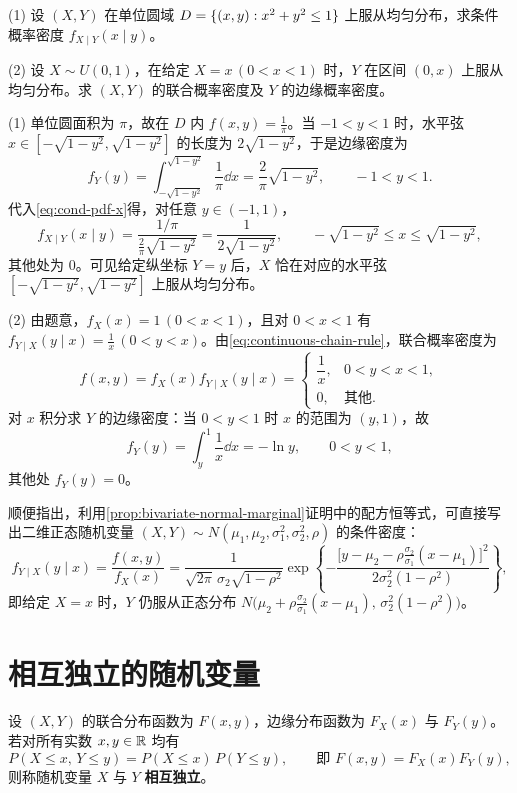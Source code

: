 \begin{example}[title={圆域均匀分布的条件密度与分层连续模型}]
\label{eg:disk-and-hierarchical-cond}
(1) 设 $(X,Y)$ 在单位圆域 $D=\{(x,y):x^2+y^2\le 1\}$ 上服从均匀分布，求条件概率密度 $f_{X\mid Y}(x\mid y)$。

(2) 设 $X\sim U(0,1)$，在给定 $X=x\,(0<x<1)$ 时，$Y$ 在区间 $(0,x)$ 上服从均匀分布。求 $(X,Y)$ 的联合概率密度及 $Y$ 的边缘概率密度。
\begin{solution}
(1) 单位圆面积为 $\pi$，故在 $D$ 内 $f(x,y)=\frac{1}{\pi}$。当 $-1<y<1$ 时，水平弦 $x\in[-\sqrt{1-y^2},\sqrt{1-y^2}]$ 的长度为 $2\sqrt{1-y^2}$，于是边缘密度为
\[
  f_Y(y)=\int_{-\sqrt{1-y^2}}^{\sqrt{1-y^2}}\frac{1}{\pi}\dd x=\frac{2}{\pi}\sqrt{1-y^2},\qquad -1<y<1.
\]
代入\eqref{eq:cond-pdf-x}得，对任意 $y\in(-1,1)$，
\[
  f_{X\mid Y}(x\mid y)=\frac{1/\pi}{\frac{2}{\pi}\sqrt{1-y^2}}=\frac{1}{2\sqrt{1-y^2}},\qquad -\sqrt{1-y^2}\le x\le\sqrt{1-y^2},
\]
其他处为 $0$。可见给定纵坐标 $Y=y$ 后，$X$ 恰在对应的水平弦 $[-\sqrt{1-y^2},\sqrt{1-y^2}]$ 上服从均匀分布。

(2) 由题意，$f_X(x)=1\,(0<x<1)$，且对 $0<x<1$ 有 $f_{Y\mid X}(y\mid x)=\frac{1}{x}\,(0<y<x)$。由\eqref{eq:continuous-chain-rule}，联合概率密度为
\[
  f(x,y)=f_X(x)f_{Y\mid X}(y\mid x)=
  \begin{cases}
    \dfrac{1}{x},& 0<y<x<1,\\
    0,& \text{其他}.
  \end{cases}
\]
对 $x$ 积分求 $Y$ 的边缘密度：当 $0<y<1$ 时 $x$ 的范围为 $(y,1)$，故
\[
  f_Y(y)=\int_{y}^{1}\frac{1}{x}\dd x=-\ln y,\qquad 0<y<1,
\]
其他处 $f_Y(y)=0$。
\end{solution}
\end{example}

顺便指出，利用\cref{prop:bivariate-normal-marginal}证明中的配方恒等式，可直接写出二维正态随机变量 $(X,Y)\sim N(\mu_1,\mu_2,\sigma_1^2,\sigma_2^2,\rho)$ 的条件密度：
\[
  f_{Y\mid X}(y\mid x)=\frac{f(x,y)}{f_X(x)}
  =\frac{1}{\sqrt{2\pi}\,\sigma_2\sqrt{1-\rho^2}}
  \exp\left\{-\frac{\bigl[y-\mu_2-\rho\frac{\sigma_2}{\sigma_1}(x-\mu_1)\bigr]^2}{2\sigma_2^2(1-\rho^2)}\right\},
\]
即给定 $X=x$ 时，$Y$ 仍服从正态分布 $N\bigl(\mu_2+\rho\frac{\sigma_2}{\sigma_1}(x-\mu_1),\,\sigma_2^2(1-\rho^2)\bigr)$。

\section{相互独立的随机变量}
\label{sec:variable-independence}

\begin{definition}[两个随机变量的相互独立性]
\label{def:rv-independence}
设 $(X,Y)$ 的联合分布函数为 $F(x,y)$，边缘分布函数为 $F_X(x)$ 与 $F_Y(y)$。若对所有实数 $x,y\in\mathbb{R}$ 均有
\begin{equation}
  P(X\le x,\,Y\le y)=P(X\le x)\,P(Y\le y),\qquad\text{即 }F(x,y)=F_X(x)F_Y(y),
  \label{eq:rv-indep-cdf}
\end{equation}
则称随机变量 $X$ 与 $Y$ \textbf{相互独立}。
\end{definition}

